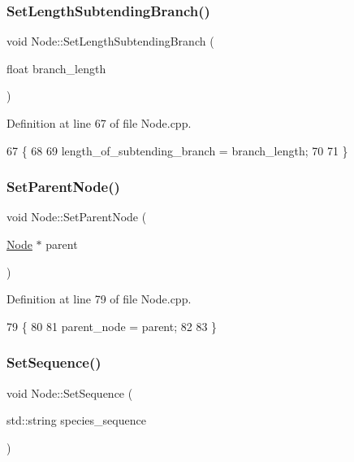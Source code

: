 \subsubsection{\texorpdfstring{Set\+Length\+Subtending\+Branch()}{SetLengthSubtendingBranch()}}
{\footnotesize\ttfamily void Node\+::\+Set\+Length\+Subtending\+Branch (\begin{DoxyParamCaption}\item[{float}]{branch\+\_\+length }\end{DoxyParamCaption})}



Definition at line 67 of file Node.\+cpp.


\begin{DoxyCode}
67                                                         \{
68   
69   length\_of\_subtending\_branch = branch\_length;
70   
71 \}
\end{DoxyCode}
\mbox{\label{classNode_acb22b8f28ca70e1316a6bafc375ee352}} 
\subsubsection{\texorpdfstring{Set\+Parent\+Node()}{SetParentNode()}}
{\footnotesize\ttfamily void Node\+::\+Set\+Parent\+Node (\begin{DoxyParamCaption}\item[{\hyperlink{classNode}{Node} $\ast$}]{parent }\end{DoxyParamCaption})}



Definition at line 79 of file Node.\+cpp.


\begin{DoxyCode}
79                                     \{
80   
81   parent\_node = parent;
82   
83 \}
\end{DoxyCode}
\mbox{\label{classNode_af92559fbef1938022d59b2902703afaa}} 
\subsubsection{\texorpdfstring{Set\+Sequence()}{SetSequence()}}
{\footnotesize\ttfamily void Node\+::\+Set\+Sequence (\begin{DoxyParamCaption}\item[{std\+::string}]{species\+\_\+sequence }\end{DoxyParamCaption})}



